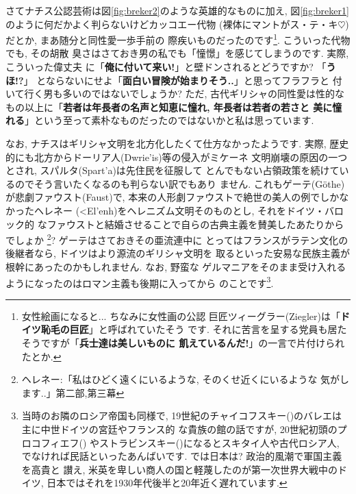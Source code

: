 さてナチス公認芸術は図\ref{fig:breker2}のような英雄的なものに加え, 図\ref{fig:breker1}のように何だかよく判らないけどカッコエー代物
(裸体にマントがス・テ・キ$\heartsuit$)だとか, まあ随分と同性愛一歩手前の
際疾いものだったのです\footnote{女性絵画になると... ちなみに女性画の公認
巨匠ツィーグラー(Ziegler)は「\textbf{ドイツ恥毛の巨匠}」と呼ばれていたそう
です. それに苦言を呈する党員も居たそうですが「\textbf{兵士達は美しいものに
飢えているんだ!}」の一言で片付けられたとか.}. こういった代物でも, その胡散
臭さはさておき男の私でも「憧憬」を感じてしまうのです. 実際, こういった偉丈夫
に「\textbf{俺に付いて来い!}」と壁ドンされるとどうですか? 「\textbf{うほ!?}」
とならないにせよ「\textbf{面白い冒険が始まりそう..}」と思ってフラフラと
付いて行く男も多いのではないでしょうか? ただ, 古代ギリシャの同性愛は性的な
もの以上に「\textbf{若者は年長者の名声と知恵に憧れ, 年長者は若者の若さと
美に憧れる}」という至って素朴なものだったのではないかと私は思っています.
\newline

なお, ナチスはギリシャ文明を北方化したくて仕方なかったようです. 実際,
 歴史的にも北方からドーリア人(\textgreek{Dwrie'is})等の侵入がミケーネ
文明崩壊の原因の一つとされ, スパルタ(\textgreek{Spart'a})は先住民を征服して
とんでもない占領政策を続けているのでそう言いたくなるのも判らない訳でもあり
ません. これもゲーテ(G\"othe)が悲劇ファウスト(Faust)\cite{ゲーテ}で,
 本来の人形劇ファウストで絶世の美人の例でしかなかったヘレネー
(\textgreek{<El'enh})をヘレニズム文明そのものとし, それをドイツ・バロック的
なファウストと結婚させることで自らの古典主義を賛美したあたりからでしょか
\footnote{ヘレネー:「私はひどく遠くにいるような, そのくせ近くにいるような
気がします..」\cite{ゲーテ}第二部,第三幕}?  ゲーテはさておきその亜流連中に
とってはフランスがラテン文化の後継者なら, ドイツはより源流のギリシャ文明を
取るといった安易な民族主義が根幹にあったのかもしれません. なお, 野蛮な
ゲルマニアをそのまま受け入れるようになったのはロマン主義も後期に入ってから
のことです\footnote{当時のお隣のロシア帝国も同様で, 19世紀のチャイコフスキー({})のバレエは主に中世ドイツの宮廷やフランス的
な貴族の館の話ですが, 20世紀初頭のプロコフィエフ({})
やストラビンスキー({})になるとスキタイ人や古代ロシア人,
 でなければ民話といったあんばいです. では日本は? 政治的風潮で軍国主義を高貴と
讃え, 米英を卑しい商人の国と軽蔑したのが第一次世界大戦中のドイツ\cite{クラウス},
 日本ではそれを1930年代後半と20年近く遅れています.}.
\newline

